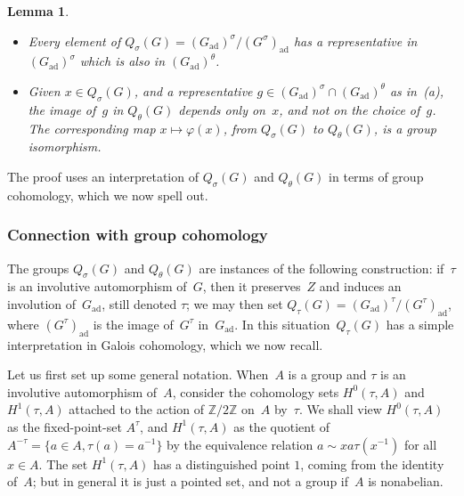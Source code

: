 \documentclass[10pt,leqno]{article}
\newtheorem{lemma}[equation]{Lemma}
\numberwithin{equation}{section}
\newcommand{\ad}{\mathrm{ad}}
\newcommand{\Gad}{G_\mathrm{ad}}
\newcommand{\Z}{\mathbb Z}
\begin{document}
\begin{lemma}\label{lem:iso_q}
\begin{itemize}
\item[(a)] 
Every element of $Q_\sigma(G)=(\Gad)^\sigma/(G^\sigma)_\ad$ has a representative in $(\Gad)^\sigma$ which is also in $(\Gad)^\theta$.
\item[(b)] Given $x \in Q_{\sigma}(G)$, and a representative $g\in (\Gad)^\sigma \cap (\Gad)^\theta$ as in~(a), the image of~$g$ in  $Q_\theta(G)$ depends only on~$x$, and not on  the choice of~$g$. The corresponding map $x \mapsto \varphi(x)$, from $Q_{\sigma}(G)$ to $Q_{\theta}(G)$, is a group isomorphism. 
\end{itemize}
\end{lemma}


The proof uses an interpretation of $Q_\sigma(G)$ and $Q_\theta(G)$ in terms of group cohomology, which we now spell out. 

\subsubsection{Connection with group cohomology}

The groups $Q_{\sigma}(G)$ and $Q_{\theta}(G)$ are instances of the following construction: if~$\tau$ is an involutive automorphism of~$G$, then it preserves~$Z$ and induces an involution of~$\Gad$, still denoted $\tau$; we may then set $Q_{\tau}(G)=(\Gad)^{\tau}/(G^{\tau})_{\ad}$, where $(G^{\tau})_{\ad}$ is the image of~$G^{\tau}$ in~$\Gad$. In this situation~$Q_{\tau}(G)$ has a simple interpretation in Galois cohomology, which we now recall. 

Let us first set up some general notation. When~$A$ is a group and $\tau$ is an involutive automorphism of~$A$, consider the cohomology sets $H^0(\tau, A)$ and $H^1(\tau, A)$ attached to the action of $\Z/2\Z$ on~$A$ by~$\tau$. We shall view   $H^0(\tau, A)$ as the fixed-point-set $A^{\tau}$, and $H^1(\tau,A)$ as the quotient of \mbox{$A^{-\tau} = \{ a \in A, \tau(a)=a^{-1}\}$} by the equivalence relation $a \sim x a \tau(x^{-1})$ for all $x \in A$. The set $H^1(\tau, A)$ has a distinguished point $1$, coming from the identity of~$A$; but in general it is just a pointed set, and not a group if~$A$ is nonabelian. 
\end{document}
